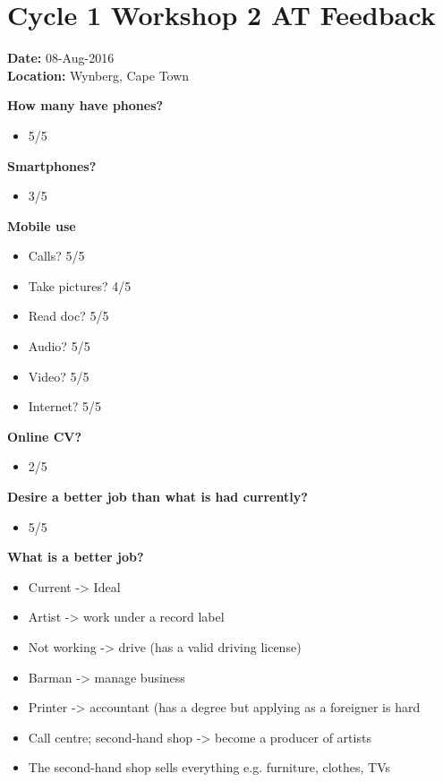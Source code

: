 \section{Cycle 1 Workshop 2 AT Feedback}

\noindent\textbf{Date:} 08-Aug-2016 \\
\noindent\textbf{Location:} Wynberg, Cape Town



\noindent\textbf{How many have phones?}
\begin{itemize}
\item 5/5
\end{itemize}

\noindent\textbf{Smartphones?}
\begin{itemize}
\item 3/5
\end{itemize}

\noindent\textbf{Mobile use}
\begin{itemize}
\item Calls? 5/5
\item Take pictures? 4/5
\item Read doc? 5/5
\item Audio? 5/5
\item Video? 5/5
\item Internet? 5/5
\end{itemize}

\noindent\textbf{Online CV?}
\begin{itemize}
\item 2/5
\end{itemize}

\noindent\textbf{Desire a better job than what is had currently?}
\begin{itemize}
\item 5/5
\end{itemize}

\noindent\textbf{What is a better job?}
\begin{itemize}
\item Current -> Ideal
\item Artist -> work under a record label
\item Not working -> drive (has a valid driving license)
\item Barman -> manage business
\item Printer -> accountant (has a degree but applying as a foreigner is hard
\item Call centre; second-hand shop -> become a producer of artists
\item The second-hand shop sells everything e.g. furniture, clothes, TVs
\end{itemize}

